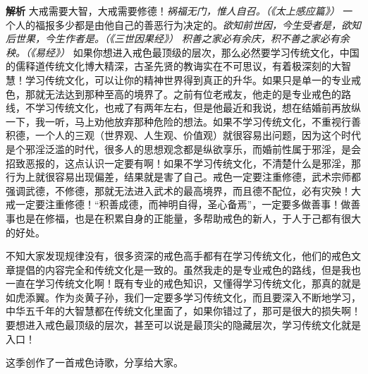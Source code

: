 \textbf{解析} 大戒需要大智，大戒需要修德！\textit{祸福无门，惟人自召。（《太上感应篇》）} 一个人的福报多少都是由他自己的善恶行为决定的。\textit{欲知前世因，今生受者是，欲知后世果，今生作者是。（《三世因果经》）} \textit{积善之家必有余庆，积不善之家必有余秧。（《易经》）} 如果你想进入戒色最顶级的层次，那么必然要学习传统文化，中国的儒释道传统文化博大精深，古圣先贤的教诲实在不可思议，有着极深刻的大智慧！学习传统文化，可以让你的精神世界得到真正的升华。如果只是单一的专业戒色，那就无法达到那种至高的境界了。之前有位老戒友，他走的是专业戒色的路线，不学习传统文化，也戒了有两年左右，但是他最近和我说，想在结婚前再放纵一下，我一听，马上劝他放弃那种危险的想法。如果不学习传统文化，不重视行善积德，一个人的三观（世界观、人生观、价值观）就很容易出问题，因为这个时代是个邪淫泛滥的时代，很多人的思想观念都是纵欲享乐，而婚前性属于邪淫，是会招致恶报的，这点认识一定要有啊！如果不学习传统文化，不清楚什么是邪淫，那行为上就很容易出现偏差，结果就是害了自己。戒色一定要注重修德，武术宗师都强调武德，不修德，那就无法进入武术的最高境界，而且德不配位，必有灾殃！大戒一定要注重修德！“积善成德，而神明自得，圣心备焉”，一定要多做善事！做善事也是在修福，也是在积累自身的正能量，多帮助戒色的新人，于人于己都有很大的好处。

不知大家发现规律没有，很多资深的戒色高手都有在学习传统文化，他们的戒色文章提倡的内容完全和传统文化是一致的。虽然我走的是专业戒色的路线，但是我也一直在学习传统文化啊！既有专业的戒色知识，又懂得学习传统文化，那真的就是如虎添翼。作为炎黄子孙，我们一定要多学习传统文化，而且要深入不断地学习，中华五千年的大智慧都在传统文化里面了，如果你错过了，那可是很大的损失啊！要想进入戒色最顶级的层次，甚至可以说是最顶尖的隐藏层次，学习传统文化就是入口！

这季创作了一首戒色诗歌，分享给大家。

